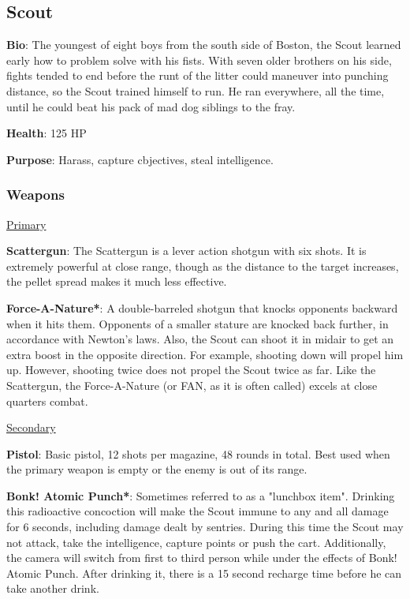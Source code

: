 \subsection{Scout}
\label{Scout}
{\bf Bio}:
The youngest of eight boys from the south side of Boston, the Scout learned early how to problem solve with his fists. With seven older brothers on his side, fights tended to end before the runt of the litter could maneuver into punching distance, so the Scout trained himself to run. He ran everywhere, all the time, until he could beat his pack of mad dog siblings to the fray.

{\bf Health}: 125 HP

{\bf Purpose}:
Harass, capture cbjectives, steal intelligence.

\subsubsection {Weapons}

\begin {center}
\underline {Primary}
\end {center}

{\bf Scattergun}:  The Scattergun is a lever action shotgun with six shots. It is extremely powerful at close range, though as the distance to the target increases, the pellet spread makes it much less effective.

{\bf Force-A-Nature*}: A double-barreled shotgun that knocks opponents backward when it hits them.  Opponents of a smaller stature are knocked back further, in accordance with Newton's laws.  Also, the Scout can shoot it in midair to get an extra boost in the opposite direction.  For example, shooting down will propel him up. However, shooting twice does not propel the Scout twice as far. Like the Scattergun, the Force-A-Nature (or FAN, as it is often called) excels at close quarters combat.


\begin {center}
\underline {Secondary}
\end {center}

{\bf Pistol}: Basic pistol, 12 shots per magazine, 48 rounds in total. Best used when the primary weapon is empty or the enemy is out of its range.

{\bf Bonk! Atomic Punch*}: Sometimes referred to as a "lunchbox item". Drinking this radioactive concoction will make the Scout immune to any and all damage for 6 seconds, including damage dealt by sentries. During this time the Scout may not attack, take the intelligence, capture points or push the cart. Additionally, the camera will switch from first to third person while under the effects of Bonk! Atomic Punch. After drinking it, there is a 15 second recharge time before he can take another drink.

